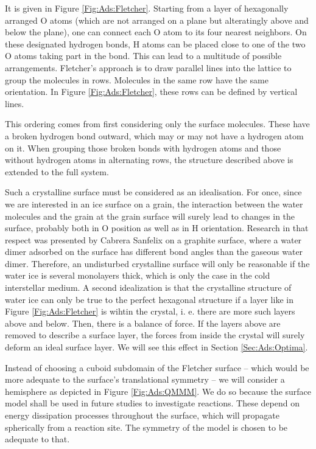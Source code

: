 \documentclass[8.5pt,twoside,twocolumn]{article}
\theoremstyle{standard}
\begin{document}
It is given in Figure \ref{Fig:Ads:Fletcher}. Starting from a layer of
hexagonally arranged O atoms (which are not arranged on a plane but 
alteratingly above and below the plane), one can connect each O atom to its
four nearest neighbors. On these designated hydrogen bonds, H atoms can be placed close
to one of the two O atoms taking part in the bond. This can lead to a multitude
of possible arrangements. Fletcher's approach is to draw parallel
lines into the lattice to group the molecules in rows. Molecules in the
same row have the same orientation. In Figure \ref{Fig:Ads:Fletcher}, these
rows can be defined by vertical lines.

This ordering comes from first considering only the surface molecules. These
have a broken hydrogen bond outward, which may or may not have a hydrogen
atom on it. When grouping those broken bonds with hydrogen atoms and those
without hydrogen atoms in alternating rows, the structure described above is
extended to the full system.

Such a crystalline surface must be considered as an idealisation. For once,
since we are interested in an ice surface on a grain, the interaction between
the water molecules and the grain at the grain surface will surely lead to
changes in the surface, probably both in O position as well as in H orientation.
Research in that respect was presented by Cabrera Sanfelix
\etal\cite{CabreraSanfelix2003} on a graphite surface, where a water dimer
adsorbed on the surface has different bond angles than the gaseous water dimer.
Therefore, an undisturbed crystalline surface will only be reasonable if the
water ice is several monolayers thick, which is only the case in the cold
interstellar medium. A second idealization is that the crystalline structure of
water ice can only be true to the perfect hexagonal structure if a layer like in
Figure \ref{Fig:Ads:Fletcher} is wihtin the crystal, i. e. there are more such
layers above and below. Then, there is a balance of force. If the layers
above are removed to describe a surface layer, the forces from inside the crystal will
surely deform an ideal surface layer. We will see this effect in Section
\ref{Sec:Ads:Optima}.

Instead of choosing a cuboid subdomain of the Fletcher surface -- which would be more adequate
to the surface's translational symmetry -- we will consider a hemisphere as depicted in Figure
\ref{Fig:Ads:QMMM}. We do so because the surface model shall be used in future studies
to investigate reactions. These depend on energy dissipation processes throughout the
surface, which will propagate spherically from a reaction site. The symmetry of the model
is chosen to be adequate to that.
\end{document}
